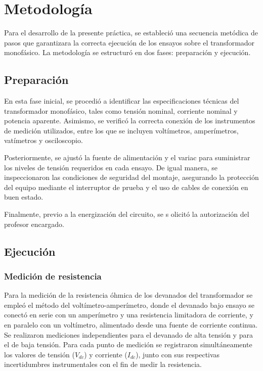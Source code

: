 \section{Metodología}

Para el desarrollo de la presente práctica, se estableció una secuencia metódica de pasos que garantizara la correcta ejecución de los ensayos sobre el transformador monofásico. La metodología se estructuró en dos fases: preparación y ejecución.

\subsection{Preparación}

En esta fase inicial, se procedió a identificar las especificaciones técnicas del transformador monofásico, tales como tensión nominal, corriente nominal y potencia aparente. Asimismo, se verificó la correcta conexión de los instrumentos de medición utilizados, entre los que se incluyen voltímetros, amperímetros, vatímetros y osciloscopio.

Posteriormente, se ajustó la fuente de alimentación y el variac para suministrar los niveles de tensión requeridos en cada ensayo. De igual manera, se inspeccionaron las condiciones de seguridad del montaje, asegurando la protección del equipo mediante el interruptor de prueba y el uso de cables de conexión en buen estado.

Finalmente, previo a la energización del circuito, se s
olicitó la autorización del profesor encargado. 

\subsection{Ejecución}

\subsubsection{Medición de resistencia}

Para la medición de la resistencia óhmica de los devanados del transformador se empleó el método del voltímetro-amperímetro, donde el devanado bajo ensayo se conectó en serie con un amperímetro y una resistencia limitadora de corriente, y en paralelo con un voltímetro, alimentado desde una fuente de corriente continua. Se realizaron mediciones independientes para el devanado de alta tensión y para el de baja tensión. Para cada punto de medición se registraron simultáneamente los valores de tensión ($V_{dc}$) y corriente ($I_{dc}$), junto con sus respectivas incertidumbres instrumentales con el fin de medir la resistencia. 

